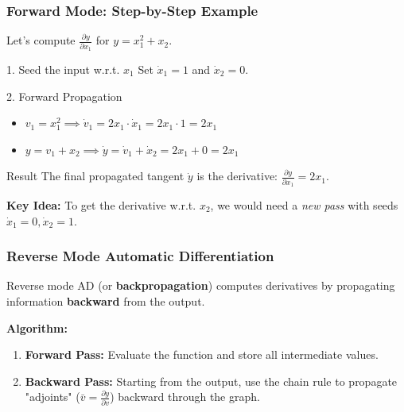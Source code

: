 \documentclass[notes]{beamer}
\begin{document}
\begin{frame}
	\frametitle{Forward Mode: Step-by-Step Example}
	
	Let's compute $\frac{\partial y}{\partial x_1}$ for $y = x_1^2 + x_2$.
	
	\begin{block}{1. Seed the input w.r.t. $x_1$}
		Set $\dot{x}_1 = 1$ and $\dot{x}_2 = 0$.
	\end{block}
	
	\begin{block}{2. Forward Propagation}
		\begin{itemize}
			\item $v_1 = x_1^2 \implies \dot{v}_1 = 2x_1 \cdot \dot{x}_1 = 2x_1 \cdot 1 = 2x_1$
			\item $y = v_1 + x_2 \implies \dot{y} = \dot{v}_1 + \dot{x}_2 = 2x_1 + 0 = 2x_1$
		\end{itemize}
	\end{block}
	
	\begin{alertblock}{Result}
		The final propagated tangent $\dot{y}$ is the derivative: $\frac{\partial y}{\partial x_1} = 2x_1$.
	\end{alertblock}
	
	\textbf{Key Idea:} To get the derivative w.r.t. $x_2$, we would need a \textit{new pass} with seeds $\dot{x}_1 = 0, \dot{x}_2 = 1$.
	
\end{frame}

\begin{frame}
	\frametitle{Reverse Mode Automatic Differentiation}
	
	Reverse mode AD (or \textbf{backpropagation}) computes derivatives by propagating information \textbf{backward} from the output.
	
	\textbf{Algorithm:}
	\begin{enumerate}
		\item \textbf{Forward Pass:} Evaluate the function and store all intermediate values.
		\item \textbf{Backward Pass:} Starting from the output, use the chain rule to propagate "adjoints" ($\bar{v} = \frac{\partial y}{\partial v}$) backward through the graph.
	\end{enumerate}
	
\end{frame}
\end{document}
